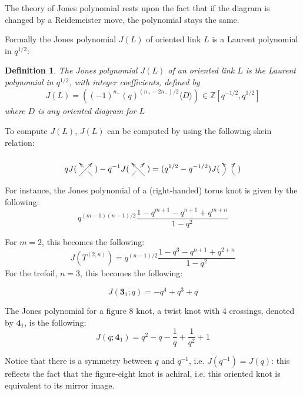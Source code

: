 \documentclass[a4paper,titlepage,twoside]{book}
\newtheorem{lemma}{Lemma}
\newtheorem{definition}{Definition}
\begin{document}

The theory of Jones polynomial rests upon the fact that if the diagram is changed by a Reidemeister move, the polynomial stays the same.  

Formally the Jones polynomial $J(L)$ of oriented link $L$ is a Laurent polynomial in $q^{1/2}$:
\begin{definition}
  The Jones polynomial $J(L)$ of an oriented link $L$ is the Laurent polynomial in $q^{1/2}$, with integer coefficients, defined by 
\begin{equation}
  J(L) =  \left( (-1)^{n_-} (q)^{ (n_+ -2n_-)/2  }  \langle D \rangle \right)_{  } \in \mathbb{Z}[q^{-1/2}, q^{1/2} ]   \label{def:Jonespoly}
\end{equation}
where $D$ is any oriented diagram for $L$
\end{definition}

To compute $J(L)$, $J(L)$ can be computed by using the following skein relation:


\begin{equation}
q J( \xygraph{
  !{0;/r1.3pc/:}
  [u(0.5)]!{\xoverv[-1]=>}
})  -q^{-1 }J(  \xygraph{
  !{0;/r1.3pc/:}
  [u(0.5)]!{\xunderv[-1]=>}
  } ) = (q^{1/2}- q^{-1/2} ) J( \xygraph{
  !{0;/r1.3pc/:}
  [u(0.5)]!{\xunoverv[-1]=>}
} )
\end{equation}

For instance, the Jones polynomial of a (right-handed) torus knot is given by the following:
\[
q^{ (m-1)(n-1)/2 } \frac{ 1 - q^{m+1} - q^{n+1} + q^{m+n} }{ 1-  q^2 }
\]

For $m=2$, this becomes the following:
\[
J(T^{(2,n)} ) = q^{ (n-1)/2 } \frac{ 1 - q^3 - q^{n+1} + q^{2 + n } }{ 1 - q^2 }
\]
For the trefoil, $n=3$, this becomes the following:

\begin{equation}
J(\mathbf{3}_1;q) =  -q^{4} + q^{3} + q
\end{equation}


The Jones polynomial for a figure 8 knot, a twist knot with 4 crossings, denoted by $\mathbf{4}_1$, is the following:
\begin{equation}
J(q;\mathbf{4}_1) = q^{2} - q - \frac{1}{q} + \frac{1}{q^{2}} + 1 
\end{equation}

Notice that there is a symmetry between $q$ and $q^{-1}$, i.e. $J(q^{-1}) = J(q)$: this reflects the fact that the figure-eight knot is achiral, i.e. this oriented knot is equivalent to its mirror image.  
\end{document}
